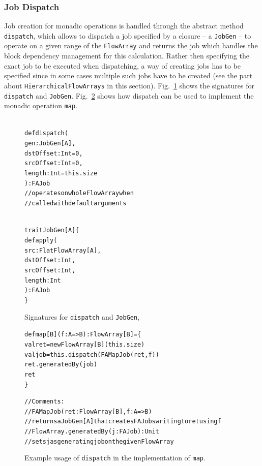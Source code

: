 \documentclass[runningheads,a4paper,fleqn]{llncs}
\begin{document}
\subsubsection{Job Dispatch}
Job creation for monadic operations is handled through the abstract
method \texttt{dispatch}, which allows to dispatch a job specified by
a closure -- a \texttt{JobGen} -- to operate on a given range of the
\texttt{FlowArray} and returns the job which handles the block dependency
management for this calculation. Rather then specifying the exact job
to be executed when dispatching, a way of creating jobs has to be 
specified since in some cases multiple such jobs have to be created
(see the part about \texttt{HierarchicalFlowArrays} in this
section). Fig.~\ref{fig:dispatch-code} shows the 
signatures for \texttt{dispatch} and
\texttt{JobGen}. Fig.~\ref{fig:dispatch-example} shows how dispatch
can be used to implement the monadic operation \texttt{map}.

\begin{figure}
\begin{minipage}[t]{6cm}
\begin{alltt}
{\scriptsize
def dispatch(
  gen: JobGen[A],
  dstOffset: Int = 0,
  srcOffset: Int = 0,
  length: Int = this.size
): FAJob
// operates on whole FlowArray when
// called with default arguments
}
\end{alltt}
\end{minipage}
\begin{minipage}[t]{7cm}
\begin{alltt}
{\scriptsize
trait JobGen[A] \{
  def apply(
    src: FlatFlowArray[A],
    dstOffset: Int,
    srcOffset: Int,
    length: Int
  ): FAJob
\}
}
\end{alltt}
\end{minipage}
\caption{Signatures for \texttt{dispatch} and \texttt{JobGen}, }
\label{fig:dispatch-code}
\end{figure}

\begin{figure}
\begin{alltt}
{\scriptsize
def map[B](f: A => B): FlowArray[B] = \{
    val ret = newFlowArray[B](this.size)
    val job = this.dispatch(FAMapJob(ret, f))
    ret.generatedBy(job)
    ret
\}

// Comments:
//  FAMapJob(ret: FlowArray[B], f: A => B)
//    returns a JobGen[A] that creates FAJobs writing to ret using f
//  FlowArray.generatedBy(j: FAJob): Unit
//    sets j as generating job on the given FlowArray
}
\end{alltt}
\caption{Example usage of \texttt{dispatch} in the implementation of
  \texttt{map}.}
\label{fig:dispatch-example}
\end{figure}
\end{document}
